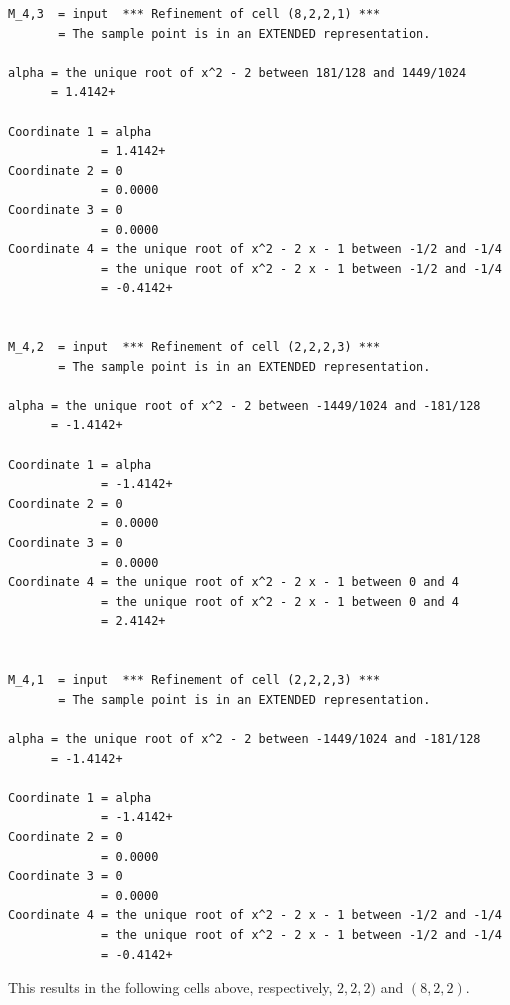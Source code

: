 \documentclass[
]{book}
\theoremstyle{definition}
\theoremstyle{definition}
\theoremstyle{definition}
\theoremstyle{definition}
\theoremstyle{remark}
\begin{document}
\begin{verbatim}
M_4,3  = input  *** Refinement of cell (8,2,2,1) ***  
       = The sample point is in an EXTENDED representation.

alpha = the unique root of x^2 - 2 between 181/128 and 1449/1024
      = 1.4142+

Coordinate 1 = alpha
             = 1.4142+
Coordinate 2 = 0
             = 0.0000
Coordinate 3 = 0
             = 0.0000
Coordinate 4 = the unique root of x^2 - 2 x - 1 between -1/2 and -1/4
             = the unique root of x^2 - 2 x - 1 between -1/2 and -1/4
             = -0.4142+


M_4,2  = input  *** Refinement of cell (2,2,2,3) ***  
       = The sample point is in an EXTENDED representation.

alpha = the unique root of x^2 - 2 between -1449/1024 and -181/128
      = -1.4142+

Coordinate 1 = alpha
             = -1.4142+
Coordinate 2 = 0
             = 0.0000
Coordinate 3 = 0
             = 0.0000
Coordinate 4 = the unique root of x^2 - 2 x - 1 between 0 and 4
             = the unique root of x^2 - 2 x - 1 between 0 and 4
             = 2.4142+


M_4,1  = input  *** Refinement of cell (2,2,2,3) ***  
       = The sample point is in an EXTENDED representation.

alpha = the unique root of x^2 - 2 between -1449/1024 and -181/128
      = -1.4142+

Coordinate 1 = alpha
             = -1.4142+
Coordinate 2 = 0
             = 0.0000
Coordinate 3 = 0
             = 0.0000
Coordinate 4 = the unique root of x^2 - 2 x - 1 between -1/2 and -1/4
             = the unique root of x^2 - 2 x - 1 between -1/2 and -1/4
             = -0.4142+
\end{verbatim}

This results in the following cells above, respectively, \(2,2,2)\) and \((8,2,2)\).
\end{document}
